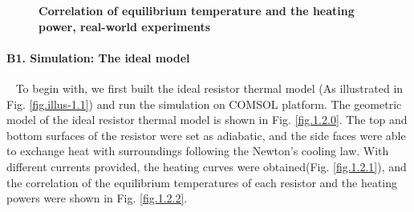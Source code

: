 \documentclass[10pt,a4paper,twocolumn,twoside,UTF8]{article}
\begin{document}
	\begin{figure}[htbp]
		\centering

		\caption{\textbf{Correlation of equilibrium temperature and the heating power, real-world experiments}}
		\label{fig.1.1.2}
	\end{figure}


	\paragraph{B1. Simulation: The ideal model}~
	\newline 
	\indent
	To begin with, we first built the ideal resistor thermal model (As illustrated in Fig. \ref{fig.illus-1.1}) and run the simulation on COMSOL platform.
	The geometric model of the ideal resistor thermal model is shown in Fig. \ref{fig.1.2.0}. 
	The top and bottom surfaces of the resistor were set as adiabatic, and the side faces were able to exchange heat with surroundings following the Newton's cooling law. 
	With different currents provided, the heating curves were obtained(Fig. \ref{fig.1.2.1}),
	and the correlation of the equilibrium temperatures of each resistor and the heating powers were shown in Fig. \ref{fig.1.2.2}.
\end{document}
